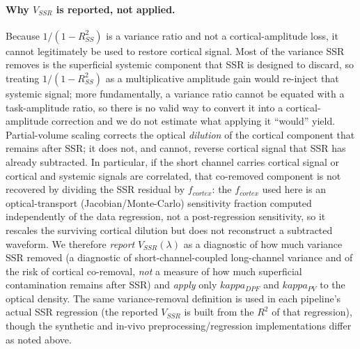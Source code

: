\documentclass[11pt]{article}
\def\kappa{kappa}%
\def\mathrm#1{#1}%
\begin{document}
\paragraph{Why $V_{\mathrm{SSR}}$ is reported, not applied.} Because $1/(1-R^2_{\mathrm{SS}})$ is a variance ratio and not a cortical-amplitude loss, it cannot legitimately be used to restore cortical signal. Most of the variance SSR removes is the superficial systemic component that SSR is designed to discard, so treating $1/(1-R^2_{\mathrm{SS}})$ as a multiplicative amplitude gain would re-inject that systemic signal; more fundamentally, a variance ratio cannot be equated with a task-amplitude ratio, so there is no valid way to convert it into a cortical-amplitude correction and we do not estimate what applying it ``would'' yield. Partial-volume scaling corrects the optical \emph{dilution} of the cortical component that remains after SSR; it does not, and cannot, reverse cortical signal that SSR has already subtracted. In particular, if the short channel carries cortical signal or cortical and systemic signals are correlated, that co-removed component is not recovered by dividing the SSR residual by $f_{\mathrm{cortex}}$: the $f_{\mathrm{cortex}}$ used here is an optical-transport (Jacobian/Monte-Carlo) sensitivity fraction computed independently of the data regression, not a post-regression sensitivity, so it rescales the surviving cortical dilution but does not reconstruct a subtracted waveform. We therefore \emph{report} $V_{\mathrm{SSR}}(\lambda)$ as a diagnostic of how much variance SSR removed (a diagnostic of short-channel-coupled long-channel variance and of the risk of cortical co-removal, \emph{not} a measure of how much superficial contamination remains after SSR) and \emph{apply} only $\kappa_{\mathrm{DPF}}$ and $\kappa_{\mathrm{PV}}$ to the optical density. The same variance-removal definition is used in each pipeline's actual SSR regression (the reported $V_{\mathrm{SSR}}$ is built from the $R^2$ of that regression), though the synthetic and in-vivo preprocessing/regression implementations differ as noted above.
\end{document}

